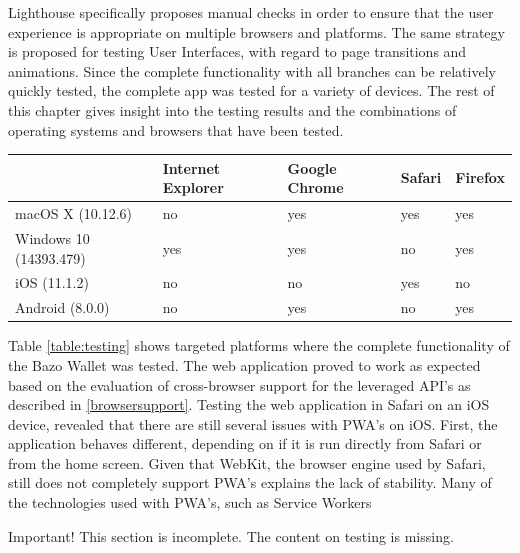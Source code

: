 Lighthouse specifically proposes manual checks in order to ensure that the user experience is appropriate on multiple browsers and platforms. The same strategy is proposed for testing User Interfaces, with regard to page transitions and animations. 
Since the complete functionality with all branches can be relatively quickly tested, the complete app was tested for a variety of devices. The rest of this chapter gives insight into the testing results and the combinations of operating systems and browsers that have been tested.


\begin{center}
    \begin{tabular}{ | l | l | l | l | p{3cm} |}
    \hline
      & Internet Explorer & Google Chrome & Safari & Firefox \\ \hline
    macOS X (10.12.6)  & no & yes & yes & yes \\ \hline
    Windows 10 (14393.479)  & yes & yes & no & yes \\ \hline    
    iOS (11.1.2)  & no & no & yes & no \\ \hline
    Android (8.0.0)  & no & yes & no & yes \\ \hline
    \end{tabular}
    \label{table:testing}
    \end{center}
Table \ref{table:testing} shows targeted platforms where the complete functionality of the Bazo Wallet was tested. The web application proved to work as expected based on the evaluation of cross-browser support for the leveraged API's as described in \ref{browsersupport}. Testing the web application in Safari on an iOS device, revealed that there are still several issues with PWA's on iOS. First, the application behaves different, depending on if it is run directly from Safari or from the home screen. Given that WebKit, the browser engine used by Safari, still does not completely support PWA's explains the lack of stability. Many of the technologies used with PWA's, such as Service Workers 
 

\begin{bclogo}[logo=\bcattention, couleurBarre=red, noborder=true, 
               couleur=LightSalmon]{Important!}
This section is incomplete. The content on testing is missing.
\end{bclogo}
\newpage
